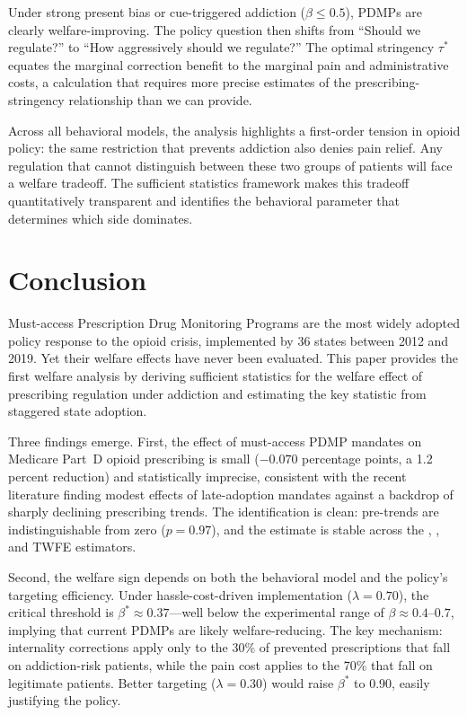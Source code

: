 \documentclass[12pt]{article}
\begin{document}
Under strong present bias or cue-triggered addiction ($\beta \leq 0.5$), PDMPs are clearly welfare-improving. The policy question then shifts from ``Should we regulate?'' to ``How aggressively should we regulate?'' The optimal stringency $\tau^*$ equates the marginal correction benefit to the marginal pain and administrative costs, a calculation that requires more precise estimates of the prescribing-stringency relationship than we can provide.

Across all behavioral models, the analysis highlights a first-order tension in opioid policy: the same restriction that prevents addiction also denies pain relief. Any regulation that cannot distinguish between these two groups of patients will face a welfare tradeoff. The sufficient statistics framework makes this tradeoff quantitatively transparent and identifies the behavioral parameter that determines which side dominates.


\section{Conclusion}\label{sec:conclusion}

Must-access Prescription Drug Monitoring Programs are the most widely adopted policy response to the opioid crisis, implemented by 36 states between 2012 and 2019. Yet their welfare effects have never been evaluated. This paper provides the first welfare analysis by deriving sufficient statistics for the welfare effect of prescribing regulation under addiction and estimating the key statistic from staggered state adoption.

Three findings emerge. First, the effect of must-access PDMP mandates on Medicare Part~D opioid prescribing is small ($-0.070$ percentage points, a 1.2 percent reduction) and statistically imprecise, consistent with the recent literature finding modest effects of late-adoption mandates against a backdrop of sharply declining prescribing trends. The identification is clean: pre-trends are indistinguishable from zero ($p = 0.97$), and the estimate is stable across the \citet{callaway2021difference}, \citet{sunab2021estimating}, and TWFE estimators.

Second, the welfare sign depends on both the behavioral model and the policy's targeting efficiency. Under hassle-cost-driven implementation ($\lambda = 0.70$), the critical threshold is $\beta^* \approx 0.37$---well below the experimental range of $\beta \approx 0.4$--$0.7$, implying that current PDMPs are likely welfare-reducing. The key mechanism: internality corrections apply only to the 30\% of prevented prescriptions that fall on addiction-risk patients, while the pain cost applies to the 70\% that fall on legitimate patients. Better targeting ($\lambda = 0.30$) would raise $\beta^*$ to 0.90, easily justifying the policy.
\end{document}
